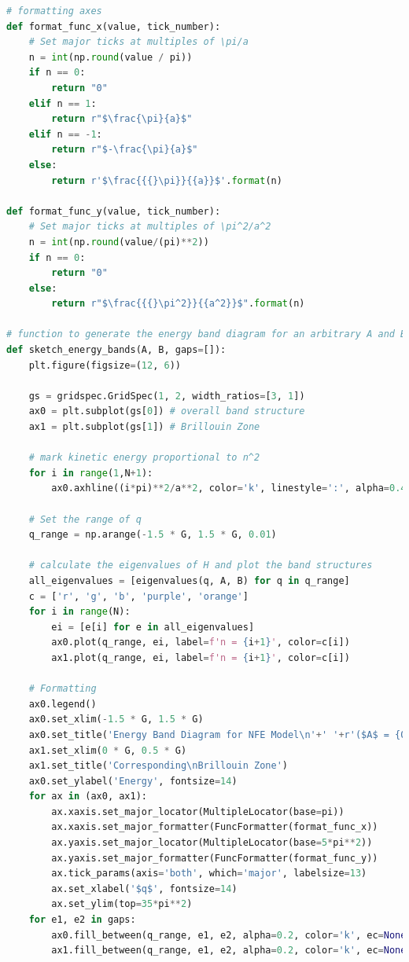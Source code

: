 \documentclass[12pt,a4paper]{article}
\begin{document}
\begin{lstlisting}[language=Python, caption=Generation of Band Structures]
# formatting axes
def format_func_x(value, tick_number):
    # Set major ticks at multiples of \pi/a
    n = int(np.round(value / pi))
    if n == 0:
        return "0"
    elif n == 1:
        return r"$\frac{\pi}{a}$"
    elif n == -1:
        return r"$-\frac{\pi}{a}$"
    else:
        return r'$\frac{{{}\pi}}{{a}}$'.format(n)

def format_func_y(value, tick_number):
    # Set major ticks at multiples of \pi^2/a^2
    n = int(np.round(value/(pi)**2))
    if n == 0:
        return "0"
    else:
        return r"$\frac{{{}\pi^2}}{{a^2}}$".format(n)

# function to generate the energy band diagram for an arbitrary A and B
def sketch_energy_bands(A, B, gaps=[]):
    plt.figure(figsize=(12, 6))

    gs = gridspec.GridSpec(1, 2, width_ratios=[3, 1]) 
    ax0 = plt.subplot(gs[0]) # overall band structure
    ax1 = plt.subplot(gs[1]) # Brillouin Zone

    # mark kinetic energy proportional to n^2
    for i in range(1,N+1):
        ax0.axhline((i*pi)**2/a**2, color='k', linestyle=':', alpha=0.4)

    # Set the range of q
    q_range = np.arange(-1.5 * G, 1.5 * G, 0.01)

    # calculate the eigenvalues of H and plot the band structures
    all_eigenvalues = [eigenvalues(q, A, B) for q in q_range]
    c = ['r', 'g', 'b', 'purple', 'orange']
    for i in range(N):
        ei = [e[i] for e in all_eigenvalues]
        ax0.plot(q_range, ei, label=f'n = {i+1}', color=c[i])
        ax1.plot(q_range, ei, label=f'n = {i+1}', color=c[i])

    # Formatting
    ax0.legend()
    ax0.set_xlim(-1.5 * G, 1.5 * G)
    ax0.set_title('Energy Band Diagram for NFE Model\n'+' '+r'($A$ = {0}, $B$ = {1})'.format(A, B), fontsize=14)
    ax1.set_xlim(0 * G, 0.5 * G)
    ax1.set_title('Corresponding\nBrillouin Zone')
    ax0.set_ylabel('Energy', fontsize=14)
    for ax in (ax0, ax1):
        ax.xaxis.set_major_locator(MultipleLocator(base=pi))
        ax.xaxis.set_major_formatter(FuncFormatter(format_func_x))
        ax.yaxis.set_major_locator(MultipleLocator(base=5*pi**2))
        ax.yaxis.set_major_formatter(FuncFormatter(format_func_y))
        ax.tick_params(axis='both', which='major', labelsize=13)
        ax.set_xlabel('$q$', fontsize=14)
        ax.set_ylim(top=35*pi**2)
    for e1, e2 in gaps:
        ax0.fill_between(q_range, e1, e2, alpha=0.2, color='k', ec=None)
        ax1.fill_between(q_range, e1, e2, alpha=0.2, color='k', ec=None)
\end{lstlisting}
\end{document}

